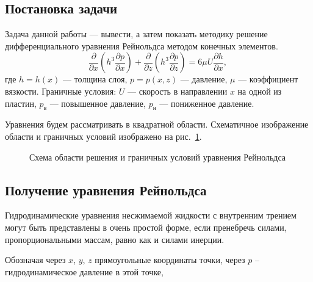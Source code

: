 \documentclass[a4paper,14pt]{extarticle}
\begin{document}
\subsection{Постановка задачи}
Задача данной работы --- вывести, а затем показать методику решение дифференциального уравнения Рейнольдса методом конечных элементов.
\begin{equation}
	\label{reinolts-task}
\frac{\partial}{\partial x} \left(h^3 \frac{\partial p}{\partial x} \right) + \frac{\partial}{\partial z} \left(h^3 \frac{\partial p}{\partial z} \right) = 6 \mu U \frac{\partial h}{\partial x} \text{, }
\end{equation}
где $h = h(x)$ --- толщина слоя, $p = p(x, z)$ --- давление, $\mu$ --- коэффициент вязкости. Граничные условия: $U$ --- скорость в направлении $x$ на одной из пластин, $p_{\text{в}}$ --- повышенное давление, $p_{\text{н}}$ --- пониженное давление. 

Уравнения будем рассматривать в квадратной области. Схематичное изображение области и граничных условий изображено на рис.~\ref{obl_resh}.

\begin{figure}[!htbp]
	\caption{Схема области решения и граничных условий уравнения Рейнольдса}
	\label{obl_resh}
\end{figure}

\subsection{Получение уравнения Рейнольдса}

Гидродинамические уравнения несжимаемой жидкости с
внутренним трением могут быть представлены в очень простой
форме, если пренебречь силами, пропорциональными массам,
равно как и силами инерции.

Обозначая через $x$, $y$, $z$ прямоугольные координаты точки, через $p$ -- гидродинамическое давление в этой точке,
\end{document}

